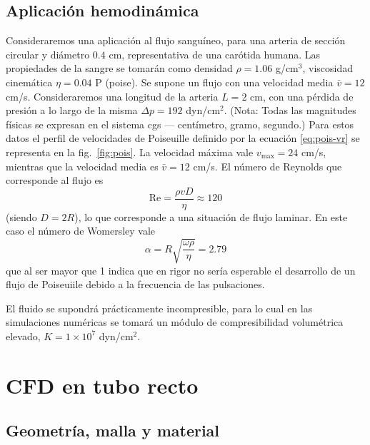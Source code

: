 \subsection{Aplicación hemodinámica}
\label{sec:aplicacion}
Consideraremos una aplicación al flujo sanguíneo, para una arteria de sección circular y diámetro $0.4$ cm, representativa de una carótida humana.
Las propiedades de la sangre se tomarán como densidad $\rho=1.06$ g/cm$^{3}$, viscosidad cinemática $\eta=0.04$ P (poise).
Se supone un flujo con una velocidad media $\bar v=12$ cm/s.
Consideraremos una longitud de la arteria $L=2$ cm, con una pérdida de presión a lo largo de la misma $\Delta p=192$ dyn/cm$^{2}$.
(Nota: Todas las magnitudes físicas se expresan en el sistema cgs --- centímetro, gramo, segundo.)
Para estos datos el perfil de velocidades de Poiseuille definido por la ecuación \eqref{eq:pois-vr} se representa en la fig.~\ref{fig:pois}.
La velocidad máxima vale $v_\text{max}=24$ cm/s, mientras que la velocidad media es $\bar v=12$ cm/s.
El número de Reynolds que corresponde al flujo es
\begin{equation*}
	\mathrm{Re} = \frac{\rho v D}{\eta} \approx 120
\end{equation*}
(siendo $D=2R$), lo que corresponde a una situación de flujo laminar.
En este caso el número de Womersley vale
\begin{equation}
	\alpha=R\sqrt{\frac{\omega\rho}{\eta}} = 2.79
\end{equation}
que al ser mayor que 1 indica que en rigor no sería esperable el desarrollo de un flujo de Poiseuiile debido a la frecuencia de las pulsaciones.

El fluido se supondrá prácticamente incompresible, para lo cual en las simulaciones numéricas se tomará un módulo de compresibilidad volumétrica elevado, $K=1\times 10^{7}$ dyn/cm$^{2}$.

\section{CFD en tubo recto}
\label{sec:tuborecto}

\subsection{Geometría, malla y material}

